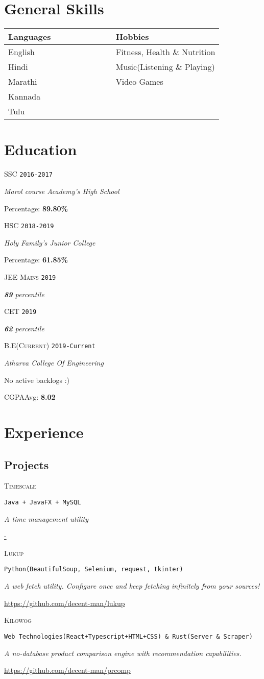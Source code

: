 \documentclass{article}
\newcommand{\school}{Marol course Academy's High School}
\newcommand{\hischool}{Holy Family's Junior College}
\newcommand{\college}{Atharva College Of Engineering}
\newcommand{\halfwidth}{0.50\linewidth}
\newcommand{\course}[6]{
	\begin{minipage}[t]{.15\textwidth}
		\hfill \large \textsc{#1}\hspace{1cm}\linebreak[4]
		\vspace{1cm}
		\hfill \footnotesize \texttt{#2}
	\end{minipage}
	\hfill\vline\hfill
	\begin{minipage}[t]{.80\textwidth}
		\large \textsl{#3}

		#6
		
		#4: \textbf{#5}
	\end{minipage}
}
\newcommand{\currentsep}{
	\begin{center}
		\dotfill
	\end{center}
}
\newcommand{\entrance}[3]{
	\begin{minipage}[t]{.15\textwidth}
		\hfill \large \textsc{#1}\hspace{1cm}\linebreak[4]
		\vspace{1cm}
		\hfill \footnotesize \texttt{#2}
	\end{minipage}
	\hfill\vline\hfill
	\begin{minipage}[t]{.80\textwidth}
		\textsl{\textbf{#3} percentile}
	\end{minipage}
}
\newcommand{\project}[4]{
	\begin{minipage}[t]{.15\textwidth}
		\hfill \textsc{#1}
	\end{minipage}
	\hfill\vline\hfill
	\begin{minipage}[t]{.80\textwidth}

		\texttt{#2}

		\textsl{#3}

		\url{#4}

		\dotfill
	\end{minipage}
}
\begin{document}
	\section{General Skills}
		\begin{table}[h!]
			\begin{tabular}[c]{|p{\halfwidth}|p{\halfwidth}|}
					\toprule
					\textbf{Languages}		& 	\textbf{Hobbies}			\\
					\midrule
					English					&	Fitness, Health \& Nutrition	\\
					Hindi					&   Music(Listening \& Playing)		\\
					Marathi					&   Video Games						\\
					Kannada					&									\\
					Tulu					&									\\
					\bottomrule
				\end{tabular}
		\end{table}

	\section{Education}
		\course{SSC}
			{2016-2017} 
			{\school}
			{Percentage}
			{89.80\%}
			{}
		\course{HSC}
			{2018-2019} 
			{\hischool}
			{Percentage}
			{61.85\%}
			{}
		\entrance{JEE Mains}{2019}{89}
		\entrance{CET}{2019}{62}
		\currentsep
		\course{B.E\scriptsize(Current)}
			{2019-Current}
			{\college}
			{CGPA\scriptsize Avg\large}
			{8.02}
			{No active backlogs :)}
		\currentsep
	\newpage
	\section{Experience}
		\subsection{Projects}
				\project{Timescale}
				{Java + JavaFX + MySQL}
				{A time management utility}
				{-}
				\project{Lukup}
				{Python(BeautifulSoup, Selenium, request, tkinter)}
				{A web fetch utility. \footnotesize Configure once and keep fetching infinitely from your sources!}
				{https://github.com/decent-man/lukup}
				\project{Kilowog}
				{Web Technologies(React+Typescript+HTML+CSS) \& Rust(Server \& Scraper)}
				{A no-database product comparison engine with recommendation capabilities.}
				{https://github.com/decent-man/prcomp}
\end{document}

